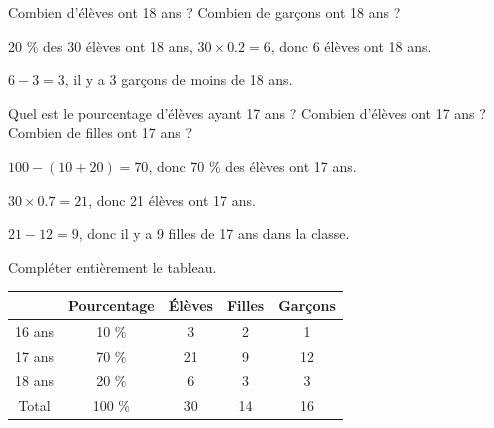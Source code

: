 \documentclass[a4paper,11pt]{exam}
\begin{document}
\begin{questions}
	\question Combien d'élèves ont 18 ans ? Combien de garçons ont 18 ans ?
	\begin{solution}
		20 \%  des 30 élèves ont 18 ans, $30 \times \num{0.2} = 6$, donc 6 élèves ont 18 ans.
		
		$6-3=3$, il y a 3 garçons de moins de 18 ans.
	\end{solution}
	
	\question Quel est le pourcentage d'élèves ayant 17 ans ? Combien d'élèves ont 17 ans ? Combien de filles ont 17 ans ?
	\begin{solution}
		$100 - (10 + 20) = 70$, donc 70 \% des élèves ont 17 ans.
		
		$30 \times \num{0.7} = 21$, donc 21 élèves ont 17 ans.
		
		$21 - 12 = 9$, donc il y a 9 filles de 17 ans dans la classe.
	\end{solution}
	
	\question Compléter entièrement le tableau.
	\begin{solution}
		\begin{center}
			\begin{tabular}{@{\ }c@{\ }|@{\ }c@{\ }|@{\ }c@{\ }|@{\ }c@{\ }|@{\ }c@{\ }|}
				\cline{2-5}
				& Pourcentage & \'Elèves & Filles & Garçons \\ \hline
				\multicolumn{1}{|c|}{16 ans} & \num{10} \% & \num{3} & \num{2}  & \num{1}  \\ \hline
				\multicolumn{1}{|c|}{17 ans} & \num{70} \% & \num{21} & \num{9} & 12 \\ \hline
				\multicolumn{1}{|c|}{18 ans} & \num{20} \%   & 6  & 3 & 3  \\ \hline
				\multicolumn{1}{|c|}{Total}  & \num{100} \% & \num{30}  & 14  & 16\\ \hline
			\end{tabular}	
		\end{center}
	\end{solution}
\end{questions}
\end{document}
